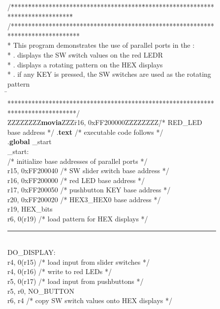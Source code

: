 \newpage
\begin{figure}[h!]
\begin{center}
\begin{minipage}[t]{12.5 cm}
\begin{tabbing}
/\=*****\=*********************************\=****************************************\=\kill
/********************************************************************************\\
\>* This program demonstrates the use of parallel ports in the \systemName:\\
\>* . displays the SW switch values on the red LEDR\\
\>* . displays a rotating pattern on the HEX displays\\
\>* . if any KEY is pressed, the SW switches are used as the rotating pattern\\
\=\kill
\>********************************************************************************/\\
ZZZZZZZZ\={\bf movia}ZZZ\=r16, 0xFF200000ZZZZZZZZ\=/* RED\_LED base address */\kill
\>.{\bf text}	\>\>/* executable code follows */\\
\>.{\bf global} \>\_start\\
\_start:\\
\>/* initialize base addresses of parallel ports */\\
 \>r15, 0xFF200040 \>/* SW slider switch base address */\\
 \>r16, 0xFF200000 \>/* red LED base address */\\
 \>r17, 0xFF200050 \>/* pushbutton KEY base address */\\
 \>r20, 0xFF200020 \>/* HEX3\_HEX0 base address */\\
 \>r19, HEX\_bits\\
 \>r6, 0(r19) \>/* load pattern for HEX displays */\\
\rule{6.0in}{0in}~\\
DO\_DISPLAY:\\
 \>r4, 0(r15) \>/* load input from slider switches */\\
 \>r4, 0(r16) \>/* write to red LEDs */\\
 \>r5, 0(r17) \>/* load input from pushbuttons */\\
 \>r5, r0, NO\_BUTTON\\
 \>r6, r4 \>/* copy SW switch values onto HEX displays */\\

\end{tabbing}
\end{minipage}
\end{center}
\end{figure}
